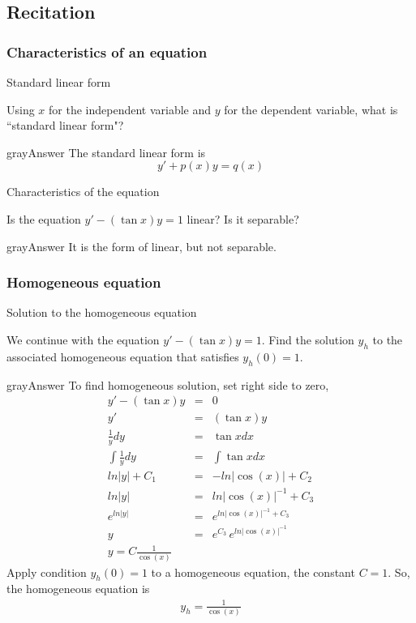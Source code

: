 \subsection{Recitation}
\subsubsection{Characteristics of an equation}
\begin{problem}
  Standard linear form
\end{problem}
Using $x$ for the independent variable and $y$ for the dependent variable,
what is “standard linear form"?
\begin{mybox}{gray}{Answer}
  The standard linear form is
  \begin{equation*}
    y' + p(x)y = q(x)
  \end{equation*}
\end{mybox}

\begin{problem}
  Characteristics of the equation
\end{problem}
Is the equation $y' − (\tan⁡ x)y = 1$ linear? Is it separable?
\begin{mybox}{gray}{Answer}
  It is the form of linear, but not separable. 
\end{mybox}

\clearpage

\subsubsection{Homogeneous equation}
\begin{problem}
  Solution to the homogeneous equation
\end{problem}
We continue with the equation $y' − (\tan⁡ x)y = 1$.
Find the solution $y_h$ to the associated homogeneous equation that satisfies $y_h (0)=1$.
\begin{mybox}{gray}{Answer}
  To find homogeneous solution, set right side to zero,
  \begin{eqnarray*}
    y' - (\tan⁡ x)y  &=& 0 \\
    y'  &=& (\tan⁡ x)y \\
    \frac{1}{y} dy &=& \tan x dx \\
    \int \frac{1}{y} dy &=& \int \tan x dx \\
    ln |y| + C_1 &=& - ln |\cos (x)| + C_2 \\
    ln |y| &=& ln |\cos (x)| ^{-1} + C_3 \\
    e^{ln |y|} &=& e^{ln |\cos (x)| ^{-1} + C_3} \\
    y &=& e^{ C_3}\,e^{ln |\cos (x)| ^{-1}} \\
    y = C \frac{1}{\cos (x)}
  \end{eqnarray*}
  Apply condition $y_h (0)=1$ to a homogeneous equation,
  the constant $C = 1$.
  So, the homogeneous equation is
  \begin{eqnarray*}
    y_h = \frac{1}{\cos(x)}
  \end{eqnarray*}
\end{mybox}
\clearpage

